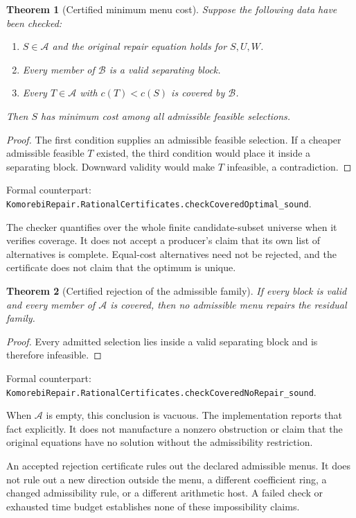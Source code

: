 \documentclass[11pt,letterpaper,oneside,openany]{book}
\theoremstyle{quiet}
\newtheorem{theorem}{Theorem}[chapter]
\newcommand{\formal}[1]{\par\nobreak\begingroup\footnotesize\color{Slate}\sffamily Formal counterpart: \normalfont\nolinkurl{#1}.\par\endgroup}
\begin{document}
\begin{theorem}[Certified minimum menu cost]
Suppose the following data have been checked:
\begin{enumerate}
 \item $S\in\mathcal A$ and the original repair equation holds for $S,U,W$.
 \item Every member of $\mathcal B$ is a valid separating block.
 \item Every $T\in\mathcal A$ with $c(T)<c(S)$ is covered by $\mathcal B$.
\end{enumerate}
Then $S$ has minimum cost among all admissible feasible selections.
\end{theorem}
\begin{proof}
The first condition supplies an admissible feasible selection. If a cheaper admissible feasible $T$ existed, the third condition would place it inside a separating block. Downward validity would make $T$ infeasible, a contradiction.
\end{proof}
\formal{KomorebiRepair.RationalCertificates.checkCoveredOptimal_sound}

The checker quantifies over the whole finite candidate-subset universe when it verifies coverage. It does not accept a producer's claim that its own list of alternatives is complete. Equal-cost alternatives need not be rejected, and the certificate does not claim that the optimum is unique.

\begin{theorem}[Certified rejection of the admissible family]
If every block is valid and every member of $\mathcal A$ is covered, then no admissible menu repairs the residual family.
\end{theorem}
\begin{proof}
Every admitted selection lies inside a valid separating block and is therefore infeasible.
\end{proof}
\formal{KomorebiRepair.RationalCertificates.checkCoveredNoRepair_sound}

When $\mathcal A$ is empty, this conclusion is vacuous. The implementation reports that fact explicitly. It does not manufacture a nonzero obstruction or claim that the original equations have no solution without the admissibility restriction.

\begin{scopebox}[title=The scope of rejection]
An accepted rejection certificate rules out the declared admissible menus. It does not rule out a new direction outside the menu, a different coefficient ring, a changed admissibility rule, or a different arithmetic host. A failed check or exhausted time budget establishes none of these impossibility claims.
\end{scopebox}
\end{document}
